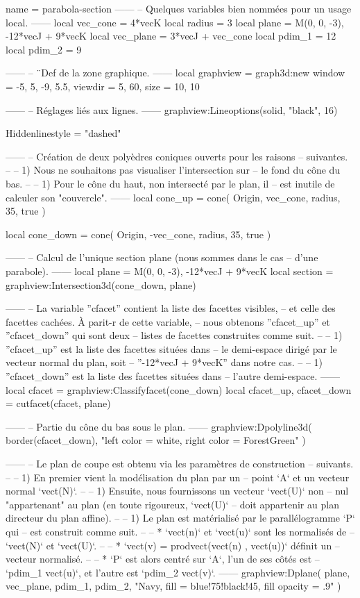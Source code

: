 \documentclass{standalone}
\begin{document}
\begin{luadraw}{name = parabola-section}
------
-- Quelques variables bien nommées pour un usage local.
------
local vec_cone  = 4*vecK
local radius  = 3
local plane   = {M(0, 0, -3), -12*vecJ + 9*vecK}
local vec_plane = 3*vecJ + vec_cone
local pdim_1  = 12
local pdim_2  = 9

------
-- ¨Def de la zone graphique.
------
local graphview = graph3d:new{
  window  = {-5, 5, -9, 5.5},
  viewdir = {5, 60},
  size    = {10, 10}
}

------
-- Réglages liés aux lignes.
------
graphview:Lineoptions(solid, "black", 16)

Hiddenlinestyle = "dashed"

------
-- Création de deux polyèdres coniques ouverts pour les raisons
-- suivantes.
--
--     1) Nous ne souhaitons pas visualiser l'intersection sur
--     le fond du cône du bas.
--
--     1) Pour le cône du haut, non intersecté par le plan, il
--     est inutile de calculer son "couvercle".
------
local cone_up = cone(
  Origin, vec_cone, radius,
  35,
  true
)

local cone_down = cone(
  Origin, -vec_cone, radius,
  35,
  true
)

------
-- Calcul de l'unique section plane (nous sommes dans le cas
-- d'une parabole).
------
local plane   = {M(0, 0, -3), -12*vecJ + 9*vecK}
local section = graphview:Intersection3d(cone_down, plane)

------
-- La variable ''cfacet'' contient la liste des facettes visibles,
-- et celle des facettes cachées. À parit-r de cette variable,
-- nous obtenons ''cfacet_up'' et ''cfacet_down'' qui sont deux
-- listes de facettes construites comme suit.
--
--   1) ''cfacet_up'' est la liste des facettes situées dans
--   le demi-espace dirigé par le vecteur normal du plan, soit
--   ''-12*vecJ + 9*vecK'' dans notre cas.
--
--   1) ''cfacet_down'' est la liste des facettes situées dans
--   l’autre demi-espace.
------
local cfacet         = graphview:Classifyfacet(cone_down)
local cfacet_up, cfacet_down = cutfacet(cfacet, plane)

------
-- Partie du cône du bas sous le plan.
------
graphview:Dpolyline3d(
  border(cfacet_down),
  "left color = white, right color = ForestGreen"
)

------
-- Le plan de coupe est obtenu via les paramètres de construction
-- suivants.
--
--     1) En premier vient la modélisation du plan par un
--     point `A` et un vecteur normal `vect(N)`.
--
--     1) Ensuite, nous fournissons un vecteur `vect(U)` non
--     nul "appartenant" au plan (en toute rigoureux, `vect(U)`
--     doit appartenir au plan directeur du plan affine).
--
--     1) Le plan est matérialisé par le parallélogramme `P` qui
--     est construit comme suit.
--
--         * `vect(n)` et `vect(u)` sont les normalisés de
--         `vect(N)` et `vect(U)`.
--
--         * `vect(v) = prodvect(vect(n) , vect(u))` définit un
--         vecteur normalisé.
--
--         * `P` est alors centré sur `A`, l'un de ses côtés est
--         `pdim_1 vect(u)`, et l'autre est `pdim_2 vect(v)`.
------
graphview:Dplane(
  plane,
  vec_plane, pdim_1, pdim_2,
  "Navy, fill = blue!75!black!45, fill opacity = .9"
)


\end{luadraw}
\end{document}
